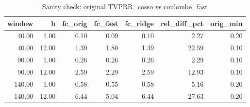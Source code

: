 \begin{table}[ht]
\centering
\begin{tabular}{rrrrrrr}
  \hline
window & h & fc\_orig & fc\_fast & fc\_ridge & rel\_diff\_pct & orig\_min \\ 
  \hline
40.00 & 1.00 & 0.10 & 0.09 & 0.10 & 2.27 & 0.20 \\ 
  40.00 & 12.00 & 1.39 & 1.80 & 1.39 & 22.59 & 0.10 \\ 
  90.00 & 1.00 & 0.26 & 0.26 & 0.26 & 2.29 & 0.10 \\ 
  90.00 & 12.00 & 2.59 & 2.29 & 2.59 & 12.93 & 0.10 \\ 
  140.00 & 1.00 & 0.58 & 0.55 & 0.58 & 5.16 & 0.20 \\ 
  140.00 & 12.00 & 6.44 & 5.04 & 6.44 & 27.63 & 0.20 \\ 
   \hline
\end{tabular}
\caption{Sanity check: original TVPRR_cosso vs coulombe_fast} 
\label{tab:sanity_coulombe}
\end{table}
